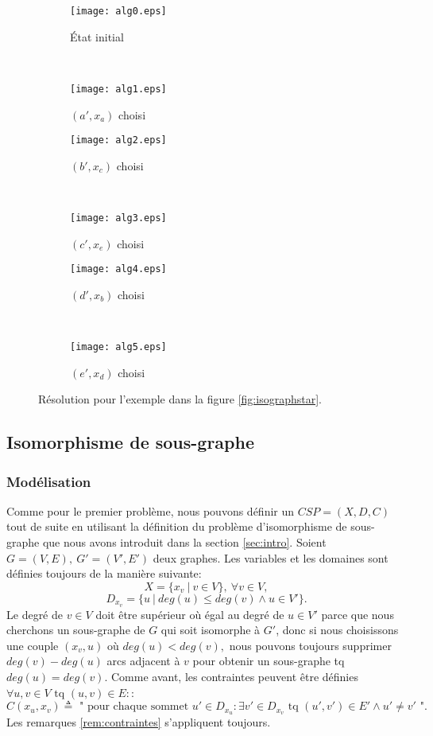 \documentclass[french]{article}
\theoremstyle{definition}
\theoremstyle{remark}
\begin{document}
\begin{figure*}[t!]
	\begin{subfigure}[t]{0.5\textwidth}
		\centering
		\texttt{[image: alg0.eps]}
		\caption{État initial}
	\end{subfigure}%
	~
	\begin{subfigure}[t]{0.5\textwidth}
		\centering
		\texttt{[image: alg1.eps]}
		\caption{$(a', x_a)$ choisi}
	\end{subfigure}
	
	\begin{subfigure}[t]{0.5\textwidth}
		\centering
		\texttt{[image: alg2.eps]}
		\caption{$(b', x_c)$ choisi}
	\end{subfigure}
	~
	\begin{subfigure}[t]{0.5\textwidth}
		\centering
		\texttt{[image: alg3.eps]}
		\caption{$(c', x_e)$ choisi}
	\end{subfigure}
	
	\begin{subfigure}[t]{0.5\textwidth}
		\centering
		\texttt{[image: alg4.eps]}
		\caption{$(d', x_b)$ choisi}
	\end{subfigure}
	~
	\begin{subfigure}[t]{0.5\textwidth}
		\centering
		\texttt{[image: alg5.eps]}
		\caption{$(e', x_d)$ choisi}
	\end{subfigure}
	\caption{\label{fig:algstar} Résolution pour l'exemple dans la figure \ref{fig:isographstar}.}
\end{figure*}




\newpage
\subsection{Isomorphisme de sous-graphe}
\subsubsection{Modélisation}
Comme pour le premier problème, nous pouvons définir un $CSP=(X, D, C)$ tout de suite en utilisant la définition du problème d'isomorphisme de sous-graphe que nous avons introduit dans la section 
\ref{sec:intro}. Soient $G=(V, E),\ G'=(V', E')$ deux graphes. Les variables et les domaines sont définies toujours de la manière suivante:
$$X=\{x_v\ |\ v \in V \},\ \forall v \in V,$$
$$D_{x_v}=\{u\ |\ deg(u) \leq deg(v) \land u \in V'\}.$$
Le degré de $v \in V$ doit être supérieur où égal au degré de $u \in V'$ parce que nous cherchons un sous-graphe de $G$ qui soit isomorphe à $G'$, donc si nous choisissons une couple $(x_v, u)$ où $deg(u) < deg(v),$ nous pouvons toujours supprimer $deg(v) - deg(u)$ arcs adjacent à $v$ pour obtenir un sous-graphe tq $deg(u) = deg(v).$
Comme avant, les contraintes peuvent être définies $\forall u, v \in V \text{ tq } (u,v) \in E:$:
$$C(x_u, x_v) \triangleq \text{ " pour chaque sommet } u' \in D_{x_u}: \exists v' \in D_{x_v} \text{ tq } (u', v') \in E' \land u' \neq v' \text{ "}.$$
Les remarques \ref{rem:contraintes} s'appliquent toujours.
\end{document}
